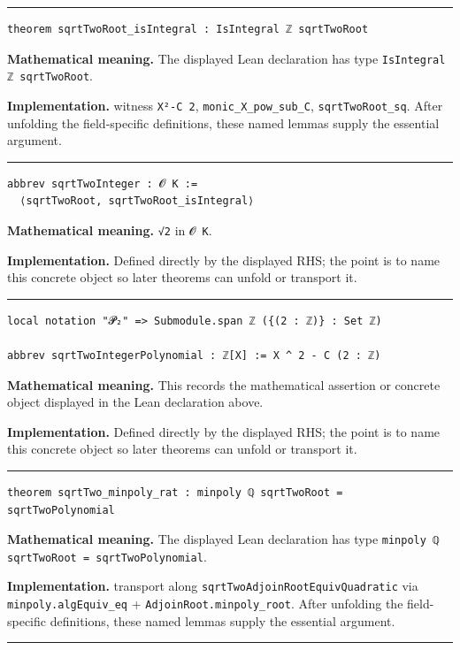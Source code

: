 \documentclass[UTF8,a4paper,11pt,fontset=fandol]{ctexart}
\theoremstyle{definition}
\newcommand{\statementsep}{\par\medskip\hrule\medskip}
\begin{document}
\statementsep
\begin{verbatim}
theorem sqrtTwoRoot_isIntegral : IsIntegral ℤ sqrtTwoRoot
\end{verbatim}
\noindent\textbf{Mathematical meaning.} The displayed Lean declaration has type \texttt{IsIntegral ℤ sqrtTwoRoot}.\par
\noindent\textbf{Implementation.} witness \texttt{X²-C 2}, \texttt{monic\_\allowbreak{}X\_\allowbreak{}pow\_\allowbreak{}sub\_\allowbreak{}C}, \texttt{sqrtTwoRoot\_\allowbreak{}sq}. After unfolding the field-specific definitions, these named lemmas supply the essential argument.\par
\statementsep
\begin{verbatim}
abbrev sqrtTwoInteger : 𝓞 K :=
  ⟨sqrtTwoRoot, sqrtTwoRoot_isIntegral⟩
\end{verbatim}
\noindent\textbf{Mathematical meaning.} \texttt{√2} in \texttt{𝓞 K}.\par
\noindent\textbf{Implementation.} Defined directly by the displayed RHS; the point is to name this concrete object so later theorems can unfold or transport it.\par
\statementsep
\begin{verbatim}
local notation "𝓟₂" => Submodule.span ℤ ({(2 : ℤ)} : Set ℤ)

abbrev sqrtTwoIntegerPolynomial : ℤ[X] := X ^ 2 - C (2 : ℤ)
\end{verbatim}
\noindent\textbf{Mathematical meaning.} This records the mathematical assertion or concrete object displayed in the Lean declaration above.\par
\noindent\textbf{Implementation.} Defined directly by the displayed RHS; the point is to name this concrete object so later theorems can unfold or transport it.\par
\statementsep
\begin{verbatim}
theorem sqrtTwo_minpoly_rat : minpoly ℚ sqrtTwoRoot = sqrtTwoPolynomial
\end{verbatim}
\noindent\textbf{Mathematical meaning.} The displayed Lean declaration has type \texttt{minpoly ℚ sqrtTwoRoot = sqrtTwoPolynomial}.\par
\noindent\textbf{Implementation.} transport along \texttt{sqrtTwoAdjoinRootEquivQuadratic} via \texttt{minpoly.\allowbreak{}algEquiv\_\allowbreak{}eq} + \texttt{AdjoinRoot.\allowbreak{}minpoly\_\allowbreak{}root}. After unfolding the field-specific definitions, these named lemmas supply the essential argument.\par
\statementsep
\end{document}
